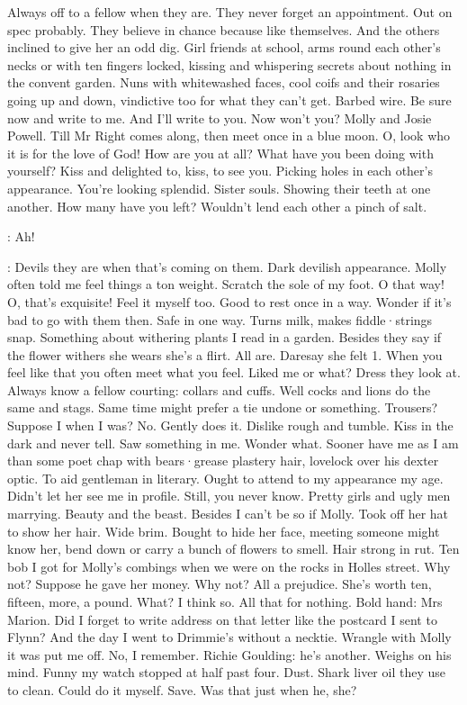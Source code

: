 Always off to a fellow
when they are.
They never forget an appointment.
Out on spec probably.
They believe in chance
because like themselves.
And the others inclined to give her an odd dig.
Girl friends at school,
arms round each other's necks
or with ten fingers locked,
kissing and whispering secrets about nothing
in the convent garden.
Nuns with whitewashed faces,
cool coifs
and their rosaries
going up and down,
vindictive too
for what they can't get.
Barbed wire.
Be sure now and write to me.
And I'll write to you.
Now won't you?
Molly and Josie Powell.
Till Mr Right comes along,
then meet once in a blue moon.
O,
look who it is
for the love of God!
How are you at all?
What have you been doing with yourself?
Kiss and delighted to,
kiss,
to see you.
Picking holes in each other's appearance.
You're looking splendid.
Sister souls.
Showing their teeth at one another.
How many have you left?
Wouldn't lend each other
a pinch of salt.

\Bloom:
Ah!

\Bloom:
Devils they are
when that's coming on them.
Dark devilish appearance.
Molly often told me
feel things a ton weight.
Scratch the sole of my foot.
O that way!
O,
that's exquisite!
Feel it myself too.
Good to rest
once in a way.
Wonder if it's bad
to go with them then.
Safe in one way.
Turns milk,
makes fiddle·strings snap.
Something about withering plants
I read in a garden.
Besides
they say if the flower withers
she wears
she's a flirt.
All are.
Daresay she felt 1.
When you feel like that
you often meet what you feel.
Liked me or what?
Dress they look at.
Always know a fellow courting:
collars and cuffs.
Well
cocks and lions do the same
and stags.
Same time
might prefer a tie undone
or something.
Trousers?
Suppose I
when I was?
No.
Gently does it.
Dislike rough and tumble.
Kiss in the dark
and never tell.
Saw something in me.
Wonder what.
Sooner have me
as I am
than some poet chap
with bears·grease plastery hair,
lovelock over his dexter optic.
To aid gentleman in literary.
Ought to attend to my appearance
my age.
Didn't let her see me in profile.
Still,
you never know.
Pretty girls and ugly men marrying.
Beauty and the beast.
Besides I can't be so if Molly.
Took off her hat to show her hair.
Wide brim.
Bought to hide her face,
meeting someone
might know her,
bend down
or carry a bunch of flowers to smell.
Hair strong in rut.
Ten bob
I got for Molly's combings
when we were on the rocks
in Holles street.
Why not?
Suppose he gave her money.
Why not?
All a prejudice.
She's worth ten,
fifteen,
more,
a pound.
What?
I think so.
All that for nothing.
Bold hand:
Mrs Marion.
Did I forget
to write address on that letter
like the postcard I sent to Flynn?
And the day I went to Drimmie's
without a necktie.
Wrangle with Molly
it was put me off.
No,
I remember.
Richie Goulding:
he's another.
Weighs on his mind.
Funny my watch stopped at half past four.
Dust.
Shark liver oil they use to clean.
Could do it myself.
Save.
Was that just when he,
she?


